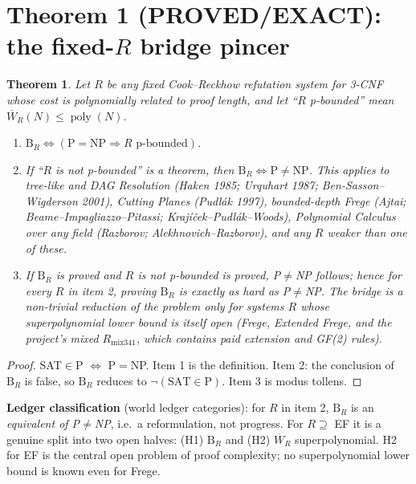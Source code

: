 \documentclass[11pt]{article}
\newtheorem{theorem}{Theorem}
\begin{document}
\section{Theorem 1 (PROVED/EXACT): the fixed-$R$ bridge pincer}
\begin{theorem}
Let $R$ be any fixed Cook--Reckhow refutation system for 3-CNF whose cost is polynomially
related to proof length, and let ``$R$ p-bounded'' mean $\overline W_R(N)\le\operatorname{poly}(N)$.
\begin{enumerate}
\item $\mathrm B_R \iff (\mathrm P=\mathrm{NP}\Rightarrow R\text{ p-bounded})$.
\item If ``$R$ is not p-bounded'' is a theorem, then $\mathrm B_R\iff \mathrm P\neq\mathrm{NP}$.
 This applies to tree-like and DAG Resolution (Haken 1985; Urquhart 1987;
 Ben-Sasson--Wigderson 2001), Cutting Planes (Pudlák 1997), bounded-depth Frege
 (Ajtai; Beame--Impagliazzo--Pitassi; Krajíček--Pudlák--Woods), Polynomial Calculus over
 any field (Razborov; Alekhnovich--Razborov), and any $R$ weaker than one of these.
\item If $\mathrm B_R$ is proved and $R$ is not p-bounded is proved, P$\neq$NP follows; hence
 for every $R$ in item 2, proving $\mathrm B_R$ is \emph{exactly} as hard as P$\neq$NP.
 The bridge is a non-trivial reduction of the problem only for systems $R$ whose
 superpolynomial lower bound is itself open (Frege, Extended Frege, and the
 project's mixed $R_{\mathrm{mix341}}$, which contains paid extension and GF(2) rules).
\end{enumerate}
\end{theorem}
\begin{proof}
SAT$\in$P $\iff$ P$=$NP. Item 1 is the definition. Item 2: the conclusion of $\mathrm B_R$ is
false, so $\mathrm B_R$ reduces to $\neg(\mathrm{SAT}\in\mathrm P)$. Item 3 is modus tollens.
\end{proof}
\textbf{Ledger classification} (world ledger categories): for $R$ in item 2, $\mathrm B_R$ is an
\emph{equivalent of P$\neq$NP}, i.e.\ a reformulation, not progress. For $R\supseteq$ EF it is
a genuine split into two open halves: (H1) $\mathrm B_R$ and (H2) $\overline W_R$
superpolynomial. H2 for EF is the central open problem of proof complexity; no
superpolynomial lower bound is known even for Frege.
\end{document}
